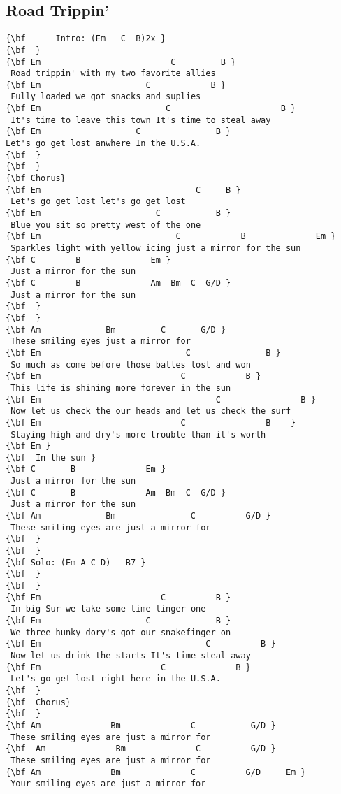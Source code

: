 \documentclass[a4paper]{article}
\begin{document}
\subsection{Road Trippin'} %
\label{sub:Road Trippin'}
\begin{Verbatim}[commandchars=\\\{\}]
{\bf 	  Intro: (Em   C  B)2x }
{\bf  }
{\bf Em                          C         B }
 Road trippin' with my two favorite allies 
{\bf Em                     C            B }
 Fully loaded we got snacks and suplies 
{\bf Em                         C                      B }
 It's time to leave this town It's time to steal away 
{\bf Em                   C               B }
Let's go get lost anwhere In the U.S.A. 
{\bf  }
{\bf  }
{\bf Chorus}
{\bf Em                               C     B }
 Let's go get lost let's go get lost 
{\bf Em                       C           B }
 Blue you sit so pretty west of the one 
{\bf Em                           C            B              Em }
 Sparkles light with yellow icing just a mirror for the sun  
{\bf C        B              Em }
 Just a mirror for the sun 
{\bf C        B              Am  Bm  C  G/D }
 Just a mirror for the sun 
{\bf  }
{\bf  }
{\bf Am             Bm         C       G/D }
 These smiling eyes just a mirror for 
{\bf Em                             C               B }
 So much as come before those batles lost and won 
{\bf Em                            C            B }
 This life is shining more forever in the sun 
{\bf Em                                   C                B }
 Now let us check the our heads and let us check the surf 
{\bf Em                            C                B    }
 Staying high and dry's more trouble than it's worth 
{\bf Em }
{\bf  In the sun }
{\bf C       B              Em }
 Just a mirror for the sun 
{\bf C       B              Am  Bm  C  G/D }
 Just a mirror for the sun 
{\bf Am             Bm               C          G/D }
 These smiling eyes are just a mirror for 
{\bf  }
{\bf  }
{\bf Solo: (Em A C D)   B7 }
{\bf  }
{\bf  }
{\bf Em                        C          B }
 In big Sur we take some time linger one 
{\bf Em                     C             B }
 We three hunky dory's got our snakefinger on 
{\bf Em                                 C          B }
 Now let us drink the starts It's time steal away 
{\bf Em                        C              B }
 Let's go get lost right here in the U.S.A. 
{\bf  }
{\bf  Chorus}
{\bf  }
{\bf Am              Bm              C           G/D }
 These smiling eyes are just a mirror for 
{\bf  Am              Bm              C          G/D }
 These smiling eyes are just a mirror for 
{\bf Am              Bm              C          G/D     Em }
 Your smiling eyes are just a mirror for 
\end{Verbatim}
\newpage
\end{document}
